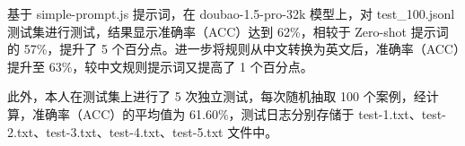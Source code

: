 基于 simple-prompt.js 提示词，在 doubao-1.5-pro-32k 模型上，对 test\_100.jsonl 测试集进行测试，结果显示准确率（ACC）达到 62\%，相较于 Zero-shot 提示词的 57\%，提升了 5 个百分点。进一步将规则从中文转换为英文后，准确率（ACC）提升至 63\%，较中文规则提示词又提高了 1 个百分点。



此外，本人在测试集上进行了 5 次独立测试，每次随机抽取 100 个案例，经计算，准确率（ACC）的平均值为 61.60\%，测试日志分别存储于 test-1.txt、test-2.txt、test-3.txt、test-4.txt、test-5.txt 文件中。

